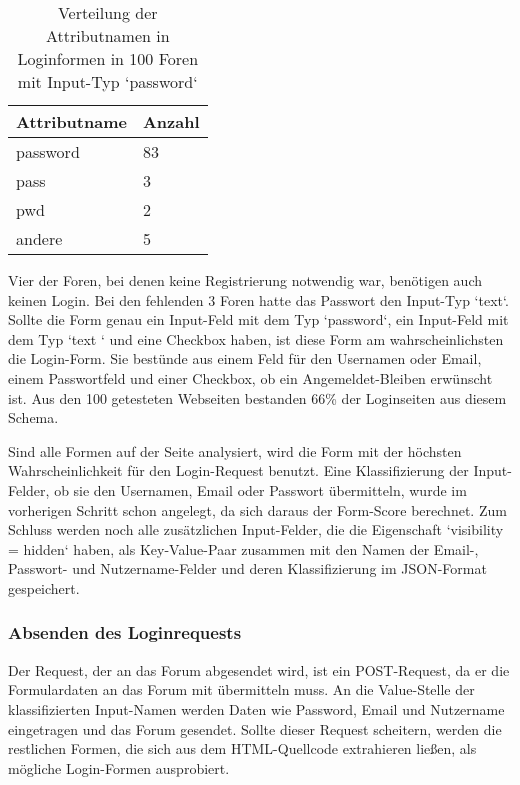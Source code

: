 \begin{table}[h!]
\centering 
\begin{tabular}{ | p{3cm} | p{3cm}|} \hline
\textbf{Attributname} & \textbf{Anzahl} \\ \hline
password & 83 \\ \hline
pass & 3 \\ \hline
pwd & 2 \\ \hline
andere & 5 \\ \hline
\end{tabular}
\caption{Verteilung der Attributnamen in Loginformen in 100 Foren mit Input-Typ `password`}
\end{table}

Vier der Foren, bei denen keine Registrierung notwendig war, benötigen auch keinen Login. Bei den fehlenden 3 Foren hatte das Passwort den Input-Typ `text`.
Sollte die Form genau ein Input-Feld mit dem Typ `password`, ein Input-Feld mit dem Typ `text ` und eine Checkbox haben, ist diese Form am wahrscheinlichsten die Login-Form. Sie bestünde aus einem Feld für den Usernamen oder Email, einem Passwortfeld und einer Checkbox, ob ein Angemeldet-Bleiben erwünscht ist. Aus den 100 getesteten Webseiten bestanden 66\% der Loginseiten aus diesem Schema.

Sind alle Formen auf der Seite analysiert, wird die Form mit der höchsten Wahrscheinlichkeit für den Login-Request benutzt. Eine Klassifizierung der Input-Felder, ob sie den Usernamen, Email oder Passwort übermitteln, wurde im vorherigen Schritt schon angelegt, da sich daraus der Form-Score berechnet. Zum Schluss werden noch alle zusätzlichen Input-Felder, die die Eigenschaft `visibility = hidden` haben, als Key-Value-Paar zusammen mit den Namen der Email-, Passwort- und Nutzername-Felder und deren Klassifizierung im JSON-Format gespeichert.

\subsubsection{Absenden des Loginrequests}
Der Request, der an das Forum abgesendet wird, ist ein POST-Request, da er die Formulardaten an das Forum mit übermitteln muss.
An die Value-Stelle der klassifizierten Input-Namen werden Daten wie Password, Email und Nutzername eingetragen und das Forum gesendet.
Sollte dieser Request scheitern, werden die restlichen Formen, die sich aus dem HTML-Quellcode extrahieren ließen, als mögliche Login-Formen ausprobiert.

